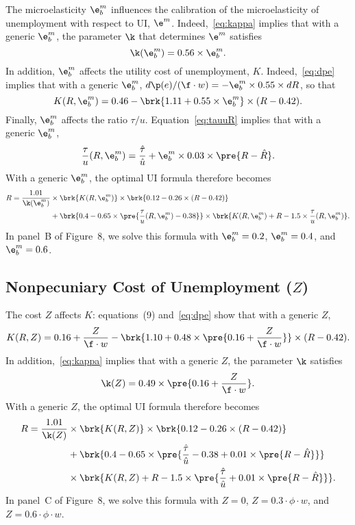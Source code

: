 \documentclass[letterpaper,12pt,leqno]{article}
\begin{document}
The microelasticity $\e^{m}_{b}$ influences the calibration of the microelasticity of unemployment with respect to UI, $\e^{m}$. Indeed,~\eqref{eq:kappa} implies that with a generic $\e^{m}_{b}$, the parameter $\k$ that determines $\e^{m}$ satisfies
\begin{equation*}
\k(\e^{m}_{b})=0.56\times \e^{m}_{b}.
\end{equation*}
In addition, $\e^{m}_{b}$ affects the utility cost of unemployment, $K$. Indeed,~\eqref{eq:dpe} implies that with a generic $\e^{m}_{b}$, $d\p(e)/(\f\cdot w) = -\e^{m}_{b}\times 0.55\times dR$, so that
\begin{equation*}
K(R,\e^{m}_{b})=0.46-\brk{1.11+0.55\times \e^{m}_{b}}\times (R-0.42).
\end{equation*}
Finally, $\e^{m}_{b}$ affects the ratio $\tau/u$. Equation~\eqref{eq:tauuR} implies that with a generic $\e^{m}_{b}$,
\begin{equation*}
\frac{\tau}{u}(R,\e^{m}_{b})  =\frac{\hat{\tau}}{\hat{u}} + \e^m_b \times 0.03 \times \pre{R-\hat{R}}.
\end{equation*}
With a generic $\e^{m}_{b}$, the optimal UI formula therefore becomes
\begin{align*}
R = \frac{1.01}{\k(\e^{m}_{b})}  & \times \brk{K(R,\e^{m}_{b})} \times \brk{0.12-0.26\times (R-0.42)}\\
&+\brk{0.4 - 0.65 \times \pre{\frac{\tau}{u}(R,\e^{m}_{b})-0.38}}\times\brk{K(R,\e^{m}_{b})+ R - 1.5 \times \frac{\tau}{u}(R,\e^{m}_{b})}.
\end{align*}
In panel~B of Figure~8, we solve this formula with $\e^{m}_{b}=0.2$, $\e^{m}_{b}=0.4$, and $\e^{m}_{b}=0.6$.

\subsection{Nonpecuniary Cost of Unemployment ($Z$)}

The cost $Z$ affects $K$: equations~(9) and~\eqref{eq:dpe} show that with a generic $Z$,
\begin{equation*}
K(R,Z)=0.16+\frac{Z}{\f\cdot w}-\brk{1.10+0.48\times \pre{0.16+\frac{Z}{\f\cdot w}}}\times (R-0.42).
\end{equation*}
In addition,~\eqref{eq:kappa} implies that with a generic $Z$, the parameter $\k$ satisfies 
\begin{equation*}
\k(Z)=0.49\times \pre{0.16+\frac{Z}{\f\cdot w}}.
\end{equation*} 
With a generic $Z$, the optimal UI formula therefore becomes
\begin{align*}
R = \frac{1.01}{\k(Z)}  &\times \brk{K(R,Z)} \times \brk{0.12-0.26\times (R-0.42)}\\
&+\brk{0.4 - 0.65 \times \pre{\frac{\hat{\tau}}{\hat{u}}-0.38+ 0.01 \times \pre{R-\hat{R}}}}\\
&\times\brk{K(R,Z)+ R - 1.5 \times \pre{\frac{\hat{\tau}}{\hat{u}}+ 0.01 \times \pre{R-\hat{R}}}}.
\end{align*}
In panel~C of Figure~8, we solve this formula with $Z=0$, $Z=0.3 \cdot \phi \cdot w$, and $Z=0.6 \cdot \phi \cdot w$.
\end{document}
